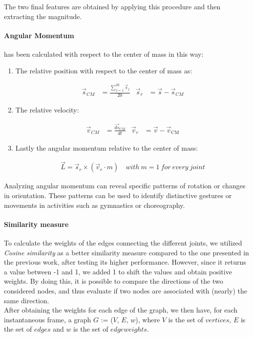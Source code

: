 The two final features are obtained by applying this procedure and then extracting the magnitude.

\paragraph{Angular Momentum} has been calculated with respect to the center of mass in this way:
\begin{enumerate}
  \item The relative position with respect to the center of mass as: 
  \begin{table}[h]
    \begin{align}
        \vec{s}_{CM} &= \frac{{\sum_{j=1}^{20} \vec{s}_{j}}}{{20}} &
        \vec{s}_{r} &= \vec{s} - \vec{s}_{CM} \label{eq:rel_pos}
    \end{align}
  \end{table}
  \item The relative velocity:
  \begin{table}[H]
    \begin{align}
        \vec{v}_{CM} &= \frac{\vec{ds}_{CM}}{dt} &
        \vec{v}_{r} &= \vec{v} - \vec{v}_{\text{CM}} \label{eq:rel_vel}
    \end{align}
  \end{table}
  \item Lastly the angular momentum relative to the center of mass:
  \begin{table}[H]
    \begin{align}
      \vec{L} = \vec{s}_{r} \times (\vec{v}_{r} \cdot m) \quad with \ m = 1 \ for \ every \ joint \label{eq:ang_mom}
    \end{align}
  \end{table}
\end{enumerate}

Analyzing angular momentum can reveal specific patterns of rotation or changes in orientation.
These patterns can be used to identify distinctive gestures or movements in activities such as gymnastics or choreography.

\paragraph{Similarity measure}
To calculate the weights of the edges connecting the different joints, we utilized \textit{Cosine similarity} as a better similarity measure compared to the one presented in the previous work, after testing its higher performance.
However, since it returns a value between -1 and 1, we added 1 to shift the values and obtain positive weights.
By doing this, it is possible to compare the directions of the two considered nodes, and thus evaluate if two nodes are associated with (nearly) the same direction. \\ 
After obtaining the weights for each edge of the graph, we then have, for each instantaneous frame, a graph $G$ := ($V$, $E$, $w$), where   
$V$ is the set of $vertices$, $E$ is the set of $edges$ and $w$ is the set of $edge weights$.

